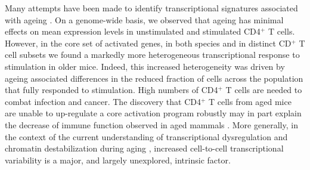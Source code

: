 Many attempts have been made to identify transcriptional signatures associated with ageing \citep{Magalhaes2009, Chen2013, Kowalczyk2015}. On a genome-wide basis, we observed that ageing has minimal effects on mean expression levels in unstimulated and stimulated CD4$^+$ T cells. However, in the core set of activated genes, in both species and in distinct CD$^+$ T cell subsets we found a markedly more heterogeneous transcriptional response to stimulation in older mice. Indeed, this increased heterogeneity was driven by ageing associated differences in the reduced fraction of cells across the population that fully responded to stimulation. High numbers of CD4$^+$ T cells are needed to combat infection and cancer. The discovery that CD4$^+$ T cells from aged mice are unable to up-regulate a core activation program robustly may in part explain the decrease of immune function observed in aged mammals \citep{Goronzy2013}. More generally, in the context of the current understanding of transcriptional dysregulation and chromatin destabilization during aging \citep{Booth2016}, increased cell-to-cell transcriptional variability is a major, and largely unexplored, intrinsic factor.\\




